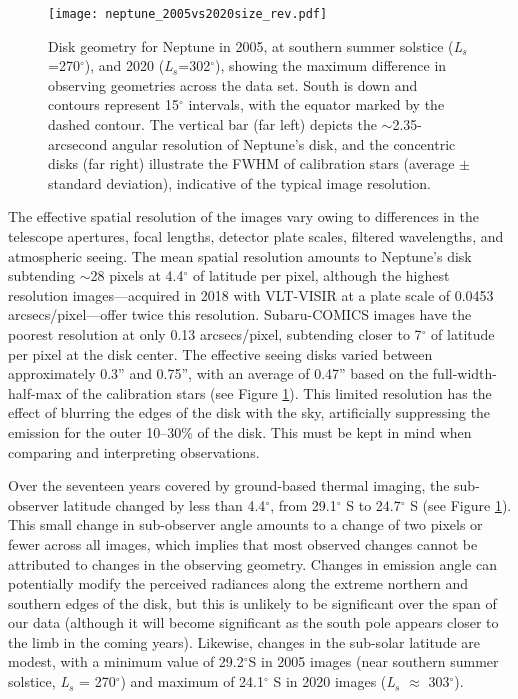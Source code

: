 \documentclass[twocolumn,10pt]{aastex631}
\begin{document}
\begin{figure}
 \centering
    \texttt{[image: neptune\_2005vs2020size\_rev.pdf]}
    \caption{Disk geometry for Neptune in 2005, at southern summer solstice (\textit{L$_s$}=270$^{\circ}$), and 2020 (\textit{L$_s$}=302$^{\circ}$), showing the maximum difference in observing geometries across the data set. South is down and contours represent 15$^{\circ}$ intervals, with the equator marked by the dashed contour. The vertical bar (far left) depicts the $\sim$2.35-arcsecond angular resolution of Neptune's disk, and the concentric disks (far right) illustrate the FWHM of calibration stars (average $\pm$ standard deviation), indicative of the typical image resolution.}
        \label{fig:geom}
\end{figure}

The effective spatial resolution of the images vary owing to differences in the telescope apertures, focal lengths, detector plate scales, filtered wavelengths, and atmospheric seeing. The mean spatial resolution amounts to Neptune's disk subtending $\sim$28 pixels at 4.4$^{\circ}$ of latitude per pixel, although the highest resolution images---acquired in 2018 with VLT-VISIR at a plate scale of 0.0453 arcsecs/pixel---offer twice this resolution. Subaru-COMICS images have the poorest resolution at only 0.13 arcsecs/pixel, subtending closer to 7$^{\circ}$ of latitude per pixel at the disk center. The effective seeing disks varied between approximately 0.3'' and 0.75'', with an average of 0.47'' based on the full-width-half-max of the calibration stars (see Figure \ref{fig:geom}). This limited resolution has the effect of blurring the edges of the disk with the sky, artificially suppressing the emission for the outer 10--30$\%$ of the disk. This must be kept in mind when comparing and interpreting observations. 

Over the seventeen years covered by ground-based thermal imaging, the sub-observer latitude changed by less than 4.4$^{\circ}$, from 29.1$^{\circ}$ S to 24.7$^{\circ}$ S (see Figure \ref{fig:geom}). This small change in sub-observer angle amounts to a change of two pixels or fewer across all images, which implies that most observed changes cannot be attributed to changes in the observing geometry. Changes in emission angle can potentially modify the perceived radiances along the extreme northern and southern edges of the disk, but this is unlikely to be significant over the span of our data (although it will become significant as the south pole appears closer to the limb in the coming years). Likewise, changes in the sub-solar latitude are modest, with a minimum value of 29.2$^{\circ}$S in 2005 images (near southern summer solstice, \textit{L$_s$} = 270$^{\circ}$) and maximum of 24.1$^{\circ}$ S in 2020 images (\textit{L$_s$} $\approx$ 303$^{\circ}$).  
\end{document}
